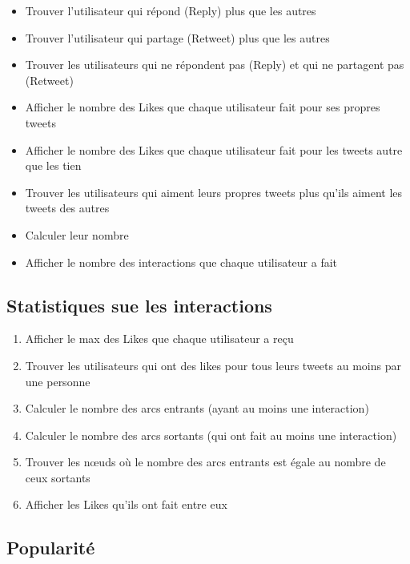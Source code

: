 \documentclass[11pt, a4paper]{article}
\begin{document}
\begin{itemize}
	\item Trouver l'utilisateur qui répond (Reply) plus que les autres
	\item Trouver l'utilisateur qui partage (Retweet) plus que les autres
	\item Trouver les utilisateurs qui ne répondent pas (Reply) et qui ne partagent pas (Retweet)
	\item Afficher le nombre des Likes que chaque utilisateur fait pour ses propres tweets
	\item Afficher le nombre des Likes que chaque utilisateur fait pour les tweets autre que les tien
	\item Trouver les utilisateurs qui aiment leurs propres tweets plus qu'ils aiment les tweets des autres
	\item Calculer leur nombre
	\item Afficher le nombre des interactions que chaque utilisateur a fait
\end{itemize}

\subsection*{Statistiques sue les interactions}

\begin{enumerate}
	\item Afficher le max des Likes que chaque utilisateur a reçu
	\item Trouver les utilisateurs qui ont des likes pour tous leurs tweets au moins par une personne
	\item Calculer le nombre des arcs entrants (ayant au moins une interaction)
	\item Calculer le nombre des arcs sortants (qui ont fait au moins une interaction)
	\item Trouver les nœuds où le nombre des arcs entrants est égale au nombre de ceux sortants
	\item Afficher les Likes qu'ils ont fait entre eux
\end{enumerate}

\subsection*{Popularité}
\end{document}
